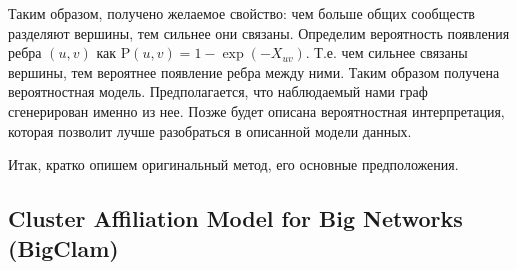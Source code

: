 \documentclass{ITaSconf}
\def\PP{\mathrm{P}}
\begin{document}
	Таким образом, получено желаемое свойство: чем больше общих сообществ разделяют вершины, тем сильнее они связаны. 
	Определим вероятность появления ребра $(u,v)$ как $\PP(u, v) = 1 - \exp ( - X_{uv})$. 
	Т.е. чем сильнее связаны вершины, тем вероятнее появление ребра между ними. 
	Таким образом получена вероятностная модель. Предполагается, что наблюдаемый нами граф сгенерирован именно из нее.
	Позже будет описана вероятностная интерпретация, которая позволит лучше разобраться в описанной модели данных.
	
	Итак, кратко опишем оригинальный метод, его основные предположения.
	
	\subsection{Cluster Affiliation Model for Big Networks (BigClam)}
	
\end{document}
